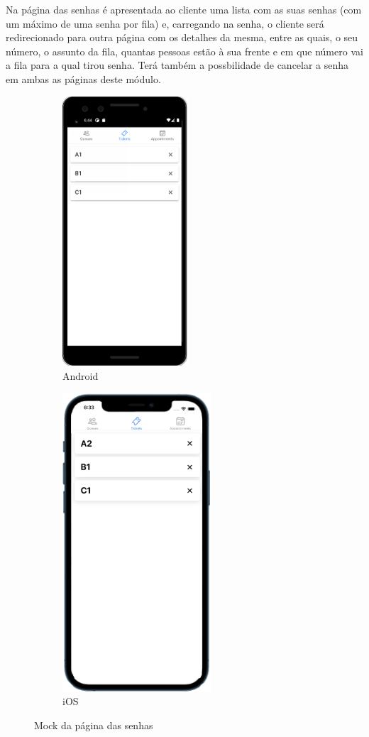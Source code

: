 \documentclass[12pt,a4paper]{article}
\begin{document}
Na página das senhas é apresentada ao cliente uma lista com as suas senhas (com um máximo de uma senha por fila) e, carregando na senha,
o cliente será redirecionado para outra página com os detalhes da mesma, entre as quais, o seu número, o assunto da fila, quantas pessoas
estão à sua frente e em que número vai a fila para a qual tirou senha. Terá também a possbilidade de cancelar a senha em ambas as páginas
deste módulo.\par

\begin{figure}
\vspace{-1 cm}
\centering
\begin{subfigure}[h]{0.5\textwidth}
  \centering
  \includegraphics[scale=0.65]{mockTicketsAndroid}
  \caption{Android}
  \label{fig:ticketsAndroid}
\end{subfigure}%
\begin{subfigure}[h]{0.5\textwidth}
  \centering
  \includegraphics[scale=0.55]{mockTicketsIOS}
  \caption{iOS}
  \label{fig:ticketsIos}
\end{subfigure}
\caption{Mock da página das senhas}
\label{fig:mockTickets}
\end{figure}
\end{document}
